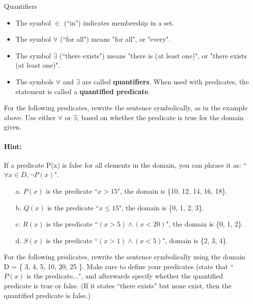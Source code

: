 {\begin{intro}{Quantifiers\\}
        \begin{itemize}
            \item The symbol $\in$ (``in") indicates membership in a set.
            \item The symbol $\forall$ (``for all") means "for all", or "every".
            \item The symbol $\exists$ (``there exists") means "there is (at least one)", or "there exists (at least one)".
            \item The symbols $\forall$ and $\exists$ are called \textbf{quantifiers}. When used
                with predicates, the statement is called a \textbf{quantified predicate}.
        \end{itemize}
    \end{intro}

    \begin{questionNOGRADE}{\thequestion}
        For the following predicates, rewrite the sentence symbolically,
        as in the example above.
        Use either $\forall$ or $\exists$, based on whether the
        predicate is true for the domain given.
        
        \paragraph{Hint:}
            If a predicate P(x) is false for all elements in the domain, you
            can phrase it as: ``$\forall x \in D, \neg P(x)$".
        
        \begin{enumerate}
            \item[a.] $P(x)$ is the predicate ``$x > 15$", the domain is \{10, 12, 14, 16, 18\}.
            \item[b.] $Q(x)$ is the predicate ``$x \leq 15$", the domain is \{0, 1, 2, 3\}.
            \item[c.] $R(x)$ is the predicate ``$(x > 5) \land (x < 20)$", the domain is \{0, 1, 2\}.
            \item[d.] $S(x)$ is the predicate ``$(x > 1) \land (x < 5)$", domain is \{2, 3, 4\}.
        \end{enumerate}
    \end{questionNOGRADE}

    \newpage

    \begin{questionNOGRADE}{\thequestion}
        For the following predicates, rewrite the sentence symbolically
        using the domain D = \{ 3, 4, 5, 10, 20, 25 \}.
        Make sure to define your predicates (state that ``$P(x)$ is the predicate...",
        and afterwards specify whether the quantified predicate is true or false.
        (If it states ``there exists" but none exist, then the quantified predicate is false.)
        

\end{questionNOGRADE}}
